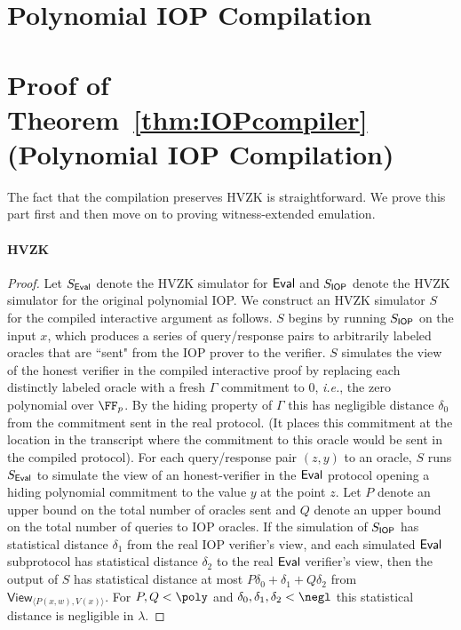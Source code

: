\section*{Polynomial IOP Compilation}
\section{Proof of Theorem~\ref{thm:IOPcompiler} (Polynomial IOP Compilation)}\label{sec:IOPcompilerproof}


\def\thetheorem{\ref{thm:IOPcompiler}}
\begin{theorem}
\theoremIOPcompiler
\end{theorem}

The fact that the compilation preserves HVZK is straightforward. We prove this part first and then move on to proving witness-extended emulation. 

\paragraph{HVZK}
\begin{proof} Let $S_\textsf{{Eval}}$ denote the HVZK simulator for $\textsf{{Eval}}$ and $S_{\textsf{{IOP}}}$ denote the HVZK simulator for the original polynomial IOP. We construct an HVZK simulator $S$ for the compiled interactive argument as follows. 
$S$ begins by running $S_{\textsf{{IOP}}}$ on the input $x$, which produces a series of query/response pairs to arbitrarily labeled oracles that are ``sent" from the IOP prover to the verifier. $S$ simulates the view of the honest verifier in the compiled interactive proof by replacing each distinctly labeled oracle with a fresh $\Gamma$ commitment to $0$, \emph{i.e.}, the zero polynomial over $\FF_p$. By the hiding property of $\Gamma$ this has negligible distance $\delta_0$ from the commitment sent in the real protocol.
(It places this commitment at the location in the transcript where the commitment to this oracle would be sent in the compiled protocol).
 For each query/response pair $(z, y)$ to an oracle, $S$ runs $S_\textsf{{Eval}}$ to simulate the view of an honest-verifier in the $\textsf{{Eval}}$ protocol opening a hiding polynomial commitment to the value $y$ at the point $z$. Let $P$ denote an upper bound on the total number of oracles sent and $Q$ denote an upper bound on the total number of queries to IOP oracles. 
If the simulation of $S_{\textsf{{IOP}}}$ has statistical distance $\delta_1$ from the real IOP verifier's view, and each simulated $\textsf{{Eval}}$ subprotocol has statistical distance $\delta_2$ to the real $\textsf{{Eval}}$ verifier's view, then the output of $S$ has statistical distance at most $P \delta_0 + \delta_1 + Q \delta_2$ from $\textsf{View}_{\langle P(x, w), V(x) \rangle}$. For $P, Q < \poly$ and $\delta_0, \delta_1, \delta_2 < \negl$ this statistical distance is negligible in $\lambda$. 
\end{proof}

